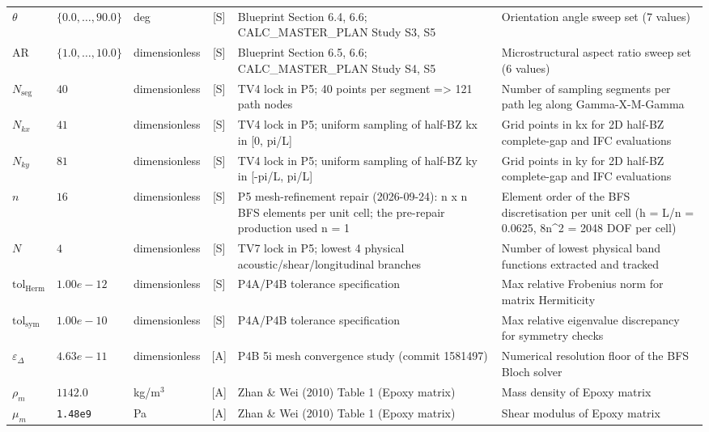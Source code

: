 \begin{xltabular}{\textwidth}{@{}l >{\raggedright\arraybackslash}p{2.2cm} >{\raggedright\arraybackslash}p{2.4cm} c L{2.6cm} Y@{}}
$\theta$ & $\{0.0, \dots, 90.0\}$ & deg & [S] & Blueprint Section 6.4, 6.6; CALC\_\hspace{0pt}MASTER\_\hspace{0pt}PLAN Study S3, S5 & Orientation angle sweep set (7 values) \\
$\mathrm{AR}$ & $\{1.0, \dots, 10.0\}$ & dimensionless & [S] & Blueprint Section 6.5, 6.6; CALC\_\hspace{0pt}MASTER\_\hspace{0pt}PLAN Study S4, S5 & Microstructural aspect ratio sweep set (6 values) \\
$N_{\mathrm{seg}}$ & $40$ & dimensionless & [S] & TV4 lock in P5; 40 points per segment => 121 path nodes & Number of sampling segments per path leg along Gamma-X-M-Gamma \\
$N_{kx}$ & $41$ & dimensionless & [S] & TV4 lock in P5; uniform sampling of half-BZ kx in [0, pi/L] & Grid points in kx for 2D half-BZ complete-gap and IFC evaluations \\
$N_{ky}$ & $81$ & dimensionless & [S] & TV4 lock in P5; uniform sampling of half-BZ ky in [-pi/L, pi/L] & Grid points in ky for 2D half-BZ complete-gap and IFC evaluations \\
$n$ & $16$ & dimensionless & [S] & P5 mesh-refinement repair (2026-09-24): n x n BFS elements per unit cell; the pre-repair production used n = 1 & Element order of the BFS discretisation per unit cell (h = L/n = 0.0625, 8n\textasciicircum{}2 = 2048 DOF per cell) \\
$N$ & $4$ & dimensionless & [S] & TV7 lock in P5; lowest 4 physical acoustic/shear/longitudinal branches & Number of lowest physical band functions extracted and tracked \\
$\mathrm{tol}_{\mathrm{Herm}}$ & $1.00e-12$ & dimensionless & [S] & P4A/P4B tolerance specification & Max relative Frobenius norm for matrix Hermiticity \\
$\mathrm{tol}_{\mathrm{sym}}$ & $1.00e-10$ & dimensionless & [S] & P4A/P4B tolerance specification & Max relative eigenvalue discrepancy for symmetry checks \\
$\varepsilon_\Delta$ & $4.63e-11$ & dimensionless & [A] & P4B 5i mesh convergence study (commit 1581497) & Numerical resolution floor of the BFS Bloch solver \\
$\rho_m$ & $1142.0$ & kg/m$^3$ & [A] & Zhan \& Wei (2010) Table 1 (Epoxy matrix) & Mass density of Epoxy matrix \\
$\mu_m$ & \texttt{1.48e9} & Pa & [A] & Zhan \& Wei (2010) Table 1 (Epoxy matrix) & Shear modulus of Epoxy matrix \\

\end{xltabular}
